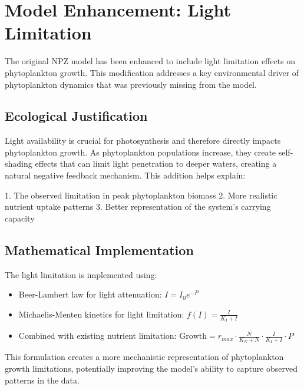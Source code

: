 \section{Model Enhancement: Light Limitation}

The original NPZ model has been enhanced to include light limitation effects on phytoplankton growth. This modification addresses a key environmental driver of phytoplankton dynamics that was previously missing from the model.

\subsection{Ecological Justification}
Light availability is crucial for photosynthesis and therefore directly impacts phytoplankton growth. As phytoplankton populations increase, they create self-shading effects that can limit light penetration to deeper waters, creating a natural negative feedback mechanism. This addition helps explain:

1. The observed limitation in peak phytoplankton biomass
2. More realistic nutrient uptake patterns
3. Better representation of the system's carrying capacity

\subsection{Mathematical Implementation}
The light limitation is implemented using:
\begin{itemize}
    \item Beer-Lambert law for light attenuation: $I = I_0 e^{-P}$
    \item Michaelis-Menten kinetics for light limitation: $f(I) = \frac{I}{K_I + I}$
    \item Combined with existing nutrient limitation: $\text{Growth} = r_{max} \cdot \frac{N}{K_N + N} \cdot \frac{I}{K_I + I} \cdot P$
\end{itemize}

This formulation creates a more mechanistic representation of phytoplankton growth limitations, potentially improving the model's ability to capture observed patterns in the data.
